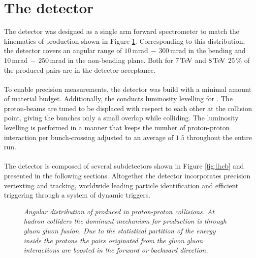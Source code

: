 \section{The \lhcb detector}
\label{sec:lhcb}
The \lhcb detector was designed as a single arm forward spectrometer \cite{lhcbletter} to match the kinematics of \bbbar production shown in Figure \ref{fig:pseudorapidity}. Corresponding to this distribution, the \lhcb detector covers an angular range of $10\,$mrad$\, - \, 300 \,$mrad in the bending and $10\,$mrad$\, - \, 250 \,$mrad in the non-bending plane. Both for $7\mathrm{\,Te\kern -0.1em V}$ and $8\mathrm{\,Te\kern -0.1em V}$ $25\,\%$ of the produced \bbbar pairs are in the detector acceptance.\\
\\
To enable precision measurements, the \lhcb detector was build with a minimal amount of material budget. Additionally, the \lhc conducts luminosity levelling for \lhcb. The proton-beams are tuned to be displaced with respect to each other at the \lhcb collision point, giving the bunches only a small overlap while colliding. The luminosity levelling is performed in a manner that keeps the number of proton-proton interaction per bunch-crossing adjusted to an average of $1.5$ throughout the entire run.\\
\\
The \lhcb detector is composed of several subdetectors shown in Figure \ref{fig:lhcb} and presented in the following sections.
Altogether the \lhcb detector incorporates precision vertexting and tracking, worldwide leading particle identification and efficient triggering through a system of dynamic triggers.
 \begin{figure}[ht]
  \begin{center}
  \vspace*{-0.5cm}
  \end{center}
  \caption{\textit{Angular distribution of \bbbar produced in proton-proton collisions. At hadron colliders the dominant mechanism for \bbbar production is through gluon gluon fusion. Due to the statistical partition of the energy inside the protons the \bbbar pairs originated from the gluon gluon interactions are boosted in the forward or backward direction.}\cite{pythia}}
  \label{fig:pseudorapidity}
\end{figure}
\newpage

\noindent%
\begin{minipage}{\linewidth}
  \label{fig:lhcb}
\end{minipage}
\newpage

